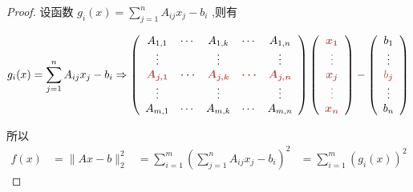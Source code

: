 \begin{proof}
    设函数 $ g_{i}(x)=\sum_{j=1}^{n} A_{i j} x_{j}-b_{i} $ ,则有

    
        \begin{equation}g_{i}( x) =\sum\limits _{j=1}^{n} A_{ij} x_{j} -b_{i} \Rightarrow \left(\begin{array}{ c c c c c }
        A_{1,1} & \cdots  & A_{1,k} & \cdots  & A_{1,n}\\
        \vdots  &  & \vdots  &  & \vdots \\
        \boldsymbol{\textcolor[rgb]{0.72,0.33,0.31}{A}\textcolor[rgb]{0.72,0.33,0.31}{_{j,1}}} & \boldsymbol{\textcolor[rgb]{0.72,0.33,0.31}{\cdots }} & \boldsymbol{\textcolor[rgb]{0.72,0.33,0.31}{A}\textcolor[rgb]{0.72,0.33,0.31}{_{j,k}}} & \boldsymbol{\textcolor[rgb]{0.72,0.33,0.31}{\cdots }} & \boldsymbol{\textcolor[rgb]{0.72,0.33,0.31}{A}\textcolor[rgb]{0.72,0.33,0.31}{_{j,n}}}\\
        \vdots  &  & \vdots  &  & \vdots \\
        A_{m,1} & \cdots  & A_{m,k} & \cdots  & A_{m,n}
        \end{array}\right)\left(\begin{array}{ c }
        \boldsymbol{\textcolor[rgb]{0.72,0.33,0.31}{x}\textcolor[rgb]{0.72,0.33,0.31}{_{1}}}\\
        \boldsymbol{\textcolor[rgb]{0.72,0.33,0.31}{\vdots }}\\
        \boldsymbol{\textcolor[rgb]{0.72,0.33,0.31}{x}\textcolor[rgb]{0.72,0.33,0.31}{_{j}}}\\
        \boldsymbol{\textcolor[rgb]{0.72,0.33,0.31}{\vdots }}\\
        \boldsymbol{\textcolor[rgb]{0.72,0.33,0.31}{x}\textcolor[rgb]{0.72,0.33,0.31}{_{n}}}
        \end{array}\right) -\left(\begin{array}{ c }
        \textcolor[rgb]{0,0,0}{b_{1}}\\
        \textcolor[rgb]{0,0,0}{\vdots }\\
        \textcolor[rgb]{0.72,0.33,0.31}{b\boldsymbol{_{j}}}\\
        \textcolor[rgb]{0,0,0}{\vdots }\\
        \textcolor[rgb]{0,0,0}{b_{n}}
        \end{array}\right)\end{equation}
    
    所以
    \begin{equation}\begin{aligned} 
        f(x)&=\|A x-b\|_{2}^{2}
        &=\sum_{i=1}^{m}\left(\sum_{j=1}^{n} A_{i j} x_{j}-b_{i}\right)^{2}
        &=\sum_{i=1}^{m}\left(g_{i}(x)\right)^{2} 
    \end{aligned}\end{equation}


\end{proof}
